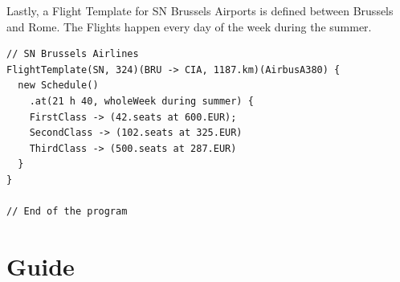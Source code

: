 \documentclass[a4paper]{article}
\begin{document}
Lastly, a Flight Template for SN Brussels Airports is defined between Brussels and Rome.
The Flights happen every day of the week during the summer.

\begin{lstlisting}
// SN Brussels Airlines
FlightTemplate(SN, 324)(BRU -> CIA, 1187.km)(AirbusA380) {
  new Schedule()
    .at(21 h 40, wholeWeek during summer) {
    FirstClass -> (42.seats at 600.EUR);
    SecondClass -> (102.seats at 325.EUR)
    ThirdClass -> (500.seats at 287.EUR)
  }
}

// End of the program
\end{lstlisting}


\section{Guide}
\label{sec:guide}

\end{document}
